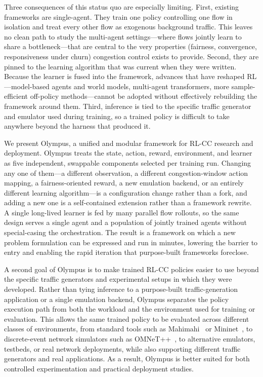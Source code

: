 Three consequences of this status quo are especially limiting. First, existing
frameworks are single-agent. They train one policy controlling one flow in
isolation and treat every other flow as exogenous background traffic. This
leaves no clean path to study the multi-agent settings---where flows jointly
learn to share a bottleneck---that are central to the very properties
(fairness, convergence, responsiveness under churn) congestion control exists
to provide. Second, they are pinned to the learning algorithm that was current
when they were written. Because the learner is fused into the framework,
advances that have reshaped RL---model-based agents and world models,
multi-agent transformers, more sample-efficient off-policy methods---cannot be
adopted without effectively rebuilding the framework around them. Third,
inference is tied to the specific traffic generator and emulator used during
training, so a trained policy is difficult to take anywhere beyond the harness
that produced it.

 We present Olympus, a unified and modular framework for
RL-CC research and deployment. Olympus treats the state, action, reward,
environment, and learner as five independent, swappable components selected per
training run. Changing any one of them---a different observation, a different
congestion-window action mapping, a fairness-oriented reward, a new emulation
backend, or an entirely different learning algorithm---is a configuration
change rather than a fork, and adding a new one is a self-contained extension
rather than a framework rewrite. A single long-lived learner is fed by many
parallel flow rollouts, so the same design serves a single agent and a
population of jointly trained agents without special-casing the orchestration.
The result is a framework on which a new problem formulation can be expressed
and run in minutes, lowering the barrier to entry and enabling the rapid
iteration that purpose-built frameworks foreclose.

A second goal of Olympus is to make trained RL-CC policies easier to use beyond
the specific traffic generators and experimental setups in which they were
developed. Rather than tying inference to a purpose-built traffic-generation
application or a single emulation backend, Olympus separates the policy
execution path from both the workload and the environment used for training or
evaluation. This allows the same trained policy to be evaluated across
different classes of environments, from standard tools such as
Mahimahi~\cite{mahimahi} or Mininet~\cite{mininet}, to discrete-event network
simulators such as OMNeT++~\cite{omnetpp}, to alternative emulators, testbeds,
or real network deployments, while also supporting different traffic generators
and real applications. As a result, Olympus is better suited for both
controlled experimentation and practical deployment studies.

